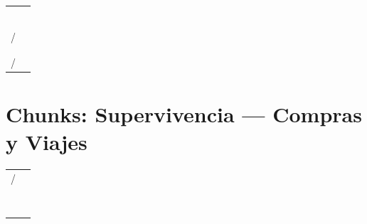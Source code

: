 \documentclass[12pt,a4paper]{article}
\begin{document}
\begin{cajachunk}
\begin{tabularx}{\textwidth}{@{} X l @{}}
\eng{I think...} & \esp{Creo que...} \\
\eng{In my opinion, ...} & \esp{En mi opinión, ...} \\
\eng{I like ... because ...} & \esp{Me gusta ... porque ...} \\
\eng{I don't like ... because ...} & \esp{No me gusta ... porque ...} \\
\eng{I prefer ... to ...} & \esp{Prefiero ... a ...} \\
\eng{I agree.} & \esp{Estoy de acuerdo.} \\
\eng{I don't agree.} / \eng{I disagree.} & \esp{No estoy de acuerdo.} \\
\eng{That's a good idea.} & \esp{Es una buena idea.} \\
\eng{I'm not sure.} & \esp{No estoy seguro.} \\
\eng{Maybe.} / \eng{Perhaps.} & \esp{Quizás. / Tal vez.} \\
\end{tabularx}
\end{cajachunk}

\section{Chunks: Supervivencia — Compras y Viajes}

\begin{cajachunk}
\begin{tabularx}{\textwidth}{@{} X l @{}}
\eng{How much is this?} / \eng{How much does this cost?} & \esp{¿Cuánto cuesta esto?} \\
\eng{I'd like ... , please.} & \esp{Quisiera ..., por favor.} \\
\eng{Can I have ... ?} & \esp{¿Me puede dar ...?} \\
\eng{Do you have ... ?} & \esp{¿Tiene ...?} \\
\eng{I'm just looking, thanks.} & \esp{Solo estoy mirando, gracias.} \\
\eng{I'll take it.} & \esp{Me lo llevo.} \\
\eng{Can I pay by card?} & \esp{¿Puedo pagar con tarjeta?} \\
\eng{Here you go.} & \esp{Aquí tiene.} \\
\eng{Keep the change.} & \esp{Quédese con el cambio.} \\
\end{tabularx}
\end{cajachunk}
\end{document}
